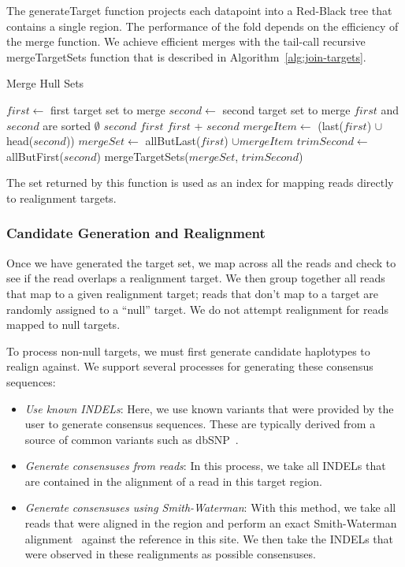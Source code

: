 \documentclass[phd]{ucbthesis}
\begin{document}
The {generateTarget} function projects each datapoint into a Red-Black tree that contains a
single region. The performance of the fold depends on the efficiency of the merge function. We achieve
efficient merges with the tail-call recursive {mergeTargetSets} function that is described in
Algorithm~\ref{alg:join-targets}.

\begin{algorithm}
\caption{Merge Hull Sets}
\label{alg:join-targets}
\begin{algorithmic}
\STATE $first \leftarrow$ first target set to merge
\STATE $second \leftarrow$ second target set to merge
\REQUIRE $first$ and $second$ are sorted
\RETURN $\emptyset$
\RETURN $second$
\RETURN $first$
\ELSE
{}
\RETURN $first$ + $second$
\ELSE
\STATE $mergeItem \leftarrow$ (last($first$) $\cup$ head($second$))
\STATE $mergeSet \leftarrow$ allButLast($first$) $\cup mergeItem$
\STATE $trimSecond \leftarrow$ allButFirst($second$)
\RETURN mergeTargetSets($mergeSet$, $trimSecond$)
\ENDIF
\ENDIF
\end{algorithmic}
\end{algorithm}

The set returned by this function is used as an index for mapping reads directly to realignment targets.

\subsubsection{Candidate Generation and Realignment}
\label{sec:candidate-generation-realignment}

Once we have generated the target set, we map across all the reads and check to see if the read overlaps
a realignment target. We then group together all reads that map to a given realignment target; reads that
don't map to a target are randomly assigned to a ``null'' target. We do not attempt realignment for reads mapped
to null targets.

To process non-null targets, we must first generate candidate haplotypes to realign against. We support several
processes for generating these consensus sequences:

\begin{itemize}
\item \emph{Use known INDELs}: Here, we use known variants that were provided by the user to generate
consensus sequences. These are typically derived from a source of common variants such as dbSNP~\cite{sherry01}.
\item \emph{Generate consensuses from reads}: In this process, we take all INDELs that are contained in
the alignment of a read in this target region.
\item \emph{Generate consensuses using Smith-Waterman}: With this method, we take all reads that were
aligned in the region and perform an exact Smith-Waterman alignment~\cite{smith81} against the reference in this site. We
then take the INDELs that were observed in these realignments as possible consensuses. 
\end{itemize}
\end{document}
